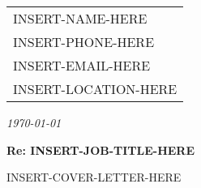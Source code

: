 \documentclass[11pt, letterpaper]{article}
\newcommand{\name}{INSERT-NAME-HERE}
\newcommand{\location}{INSERT-LOCATION-HERE}
\newcommand{\email}{INSERT-EMAIL-HERE}
\newcommand{\phone}{INSERT-PHONE-HERE}
\newcommand{\jobTitle}{INSERT-JOB-TITLE-HERE}
\begin{document}
\noindent
\hfill
\begin{tabular}{@{}l@{}}
    \name \\[0.1cm]
    \phone \\
    \email \\
    \location
\end{tabular}

\vspace{0.5cm}

\noindent\textit{\today}

\vspace{0.2cm}

\noindent\textbf{Re: \jobTitle}

\vspace{0.5cm}

INSERT-COVER-LETTER-HERE
\end{document}
